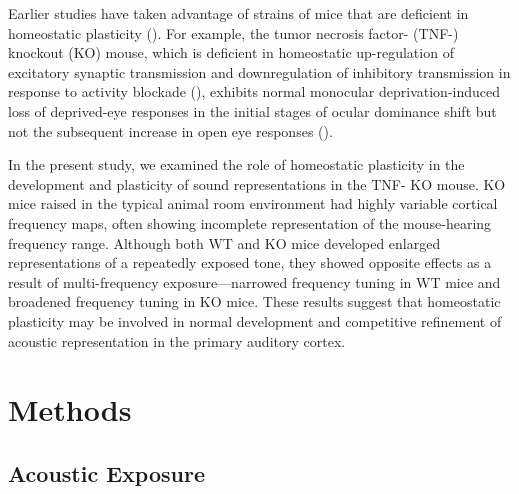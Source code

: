 Earlier studies have taken advantage of strains of mice that are deficient in homeostatic plasticity (\cite{Kaneko2008, Ranson2012}). For example, the tumor necrosis factor-\textalpha{} (TNF-\textalpha{}) knockout (KO) mouse, which is deficient in homeostatic up-regulation of excitatory synaptic transmission and downregulation of inhibitory transmission in response to activity blockade (\cite{Stellwagen2006, Kaneko2008}), exhibits normal monocular deprivation-induced loss of deprived-eye responses in the initial stages of ocular dominance shift but not the subsequent increase in open eye responses (\cite{Kaneko2008}).

In the present study, we examined the role of homeostatic plasticity in the development and plasticity of sound representations in the TNF-\textalpha{} KO mouse. KO mice raised in the typical animal room environment had highly variable cortical frequency maps, often showing incomplete representation of the mouse-hearing frequency range. Although both WT and KO mice developed enlarged representations of a repeatedly exposed tone, they showed opposite effects as a result of multi-frequency exposure---narrowed frequency tuning in WT mice and broadened frequency tuning in KO mice. These results suggest that homeostatic plasticity may be involved in normal development and competitive refinement of acoustic representation in the primary auditory cortex.

\section{Methods}

\subsection{Acoustic Exposure}

